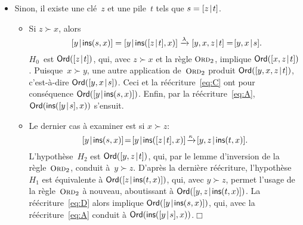 \begin{itemize}
\begin{itemize}
\begin{itemize}
      \item Sinon, il existe une clé~\(z\) et une pile~\(t\) tels que
        \(s = [{z}\!\mid\!{t}]\).
        \begin{itemize}

          \item Si \(z \succ x\), alors
            \begin{equation}
              \cons{y}{\fun{ins}(s,x)} =
              \cons{y}{\fun{ins}(\cons{z}{t},x)}
              \xrightarrow{\smash{\lambda}} \cons{y,x,z}{t} =\!
              \cons{y,x}{s}.\!\!\!\label{eq:C}
            \end{equation}
            \(H_0\)~est \(\textsf{Ord}({[{z}\!\mid\!{t}]})\), qui, avec \(z
            \succ x\) et la règle \(\TirName{Ord}_2\), implique
            \(\textsf{Ord}({[{x,z}\!\mid\!{t}]})\). Puisque~\(x \succ y\), une
            autre application de~\(\TirName{Ord}_2\) produit
            \(\textsf{Ord}({[{y,x,z}\!\mid\!{t}]})\), c'est-à-dire
            \(\textsf{Ord}({[{y,x}\!\mid\!{s}]})\). Ceci et la
            réécriture~\eqref{eq:C} ont pour conséquence
            \(\textsf{Ord}({[{y}\!\mid\!{\textsf{ins}(s,x)}]})\).
            Enfin, par la réécriture~\eqref{eq:A},
            \(\textsf{Ord}({\textsf{ins}([{y}\!\mid\!{s}],x)})\) s'ensuit.

          \item Le dernier cas à examiner est si \(x \succ z\):
            \begin{equation}
              \cons{y}{\fun{ins}(s,x)} \!=\!
              \cons{y}{\fun{ins}(\cons{z}{t},x)}
              \!\xrightarrow{\smash{\kappa}}\!
              \cons{y,z}{\fun{ins}(t,x)}.\label{eq:D}
            \end{equation}
            L'hypothèse~\(H_2\) est \(\textsf{Ord}({[{y,z}\!\mid\!{t}]})\),
            qui, par le lemme d'inversion de la
            règle~\(\TirName{Ord}_2\), conduit à~\(y \succ z\). D'après
            la dernière réécriture, l'hypothèse~\(H_1\) est équivalente à
            \(\textsf{Ord}({[{z}\!\mid\!{\textsf{ins}(t,x)}]})\), qui, avec \(y
            \succ z\), permet l'usage de la règle~\(\TirName{Ord}_2\)
            à nouveau, aboutissant à
            \(\textsf{Ord}({[{y,z}\!\mid\!{\textsf{ins}(t,x)}]})\).
            La réécriture~\eqref{eq:D} alors implique
            \(\textsf{Ord}({[{y}\!\mid\!{\textsf{ins}(s,x)}]})\), qui, avec
            la réécriture~\eqref{eq:A} conduit à
 \(\textsf{Ord}({\textsf{ins}([{y}\!\mid\!{s}],x)})\).\hfill\(\Box\)
      \end{itemize}
    \end{itemize}
  \end{itemize}
\end{itemize}

